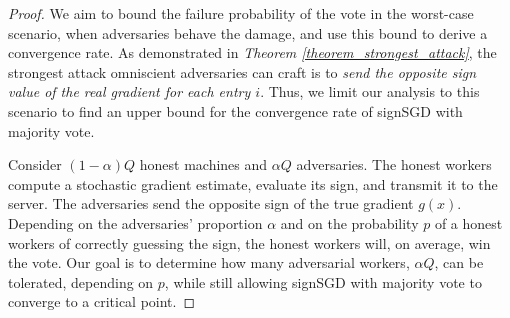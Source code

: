 \begin{proof}
\noindent We aim to bound the failure probability of the vote in the worst-case scenario, when adversaries behave the damage, and use this bound to derive a convergence rate. As demonstrated in \emph{Theorem \ref{theorem_strongest_attack}}, the strongest attack omniscient adversaries can craft is to \emph{send the opposite sign value of the real gradient for each entry $i$}. Thus, we limit our analysis to this scenario to find an upper bound for the convergence rate of signSGD with majority vote.

Consider $(1 - \alpha)Q$ honest machines and $\alpha Q$ adversaries. The honest workers compute a stochastic gradient estimate, evaluate its sign, and transmit it to the server. The adversaries send the opposite sign of the true gradient $g(x)$. Depending on the adversaries' proportion $\alpha$ and on the probability $p$ of a honest workers of correctly guessing the sign, the honest workers will, on average, win the vote. Our goal is to determine how many adversarial workers, $\alpha Q$, can be tolerated, depending on $p$, while still allowing signSGD with majority vote to converge to a critical point.


\end{proof}
